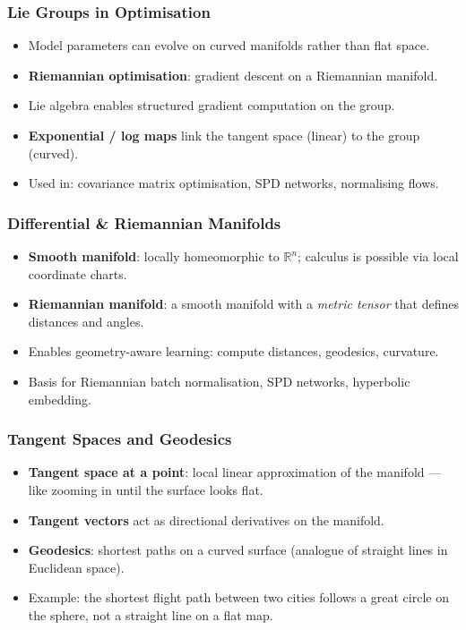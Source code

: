 \begin{frame}[fragile]\frametitle{Lie Groups in Optimisation}
  \begin{itemize}
    \item Model parameters can evolve on curved manifolds rather than flat space.
    \item \textbf{Riemannian optimisation}: gradient descent on a Riemannian manifold.
    \item Lie algebra enables structured gradient computation on the group.
    \item \textbf{Exponential / log maps} link the tangent space (linear) to the group (curved).
    \item Used in: covariance matrix optimisation, SPD networks, normalising flows.
  \end{itemize}
\end{frame}

\begin{frame}[fragile]\frametitle{Differential \& Riemannian Manifolds}
  \begin{itemize}
    \item \textbf{Smooth manifold}: locally homeomorphic to $\mathbb{R}^n$; calculus is possible via local coordinate charts.
    \item \textbf{Riemannian manifold}: a smooth manifold with a \emph{metric tensor} that defines distances and angles.
    \item Enables geometry-aware learning: compute distances, geodesics, curvature.
    \item Basis for Riemannian batch normalisation, SPD networks, hyperbolic embedding.
  \end{itemize}
\end{frame}

\begin{frame}[fragile]\frametitle{Tangent Spaces and Geodesics}
  \begin{itemize}
    \item \textbf{Tangent space at a point}: local linear approximation of the manifold --- like zooming in until the surface looks flat.
    \item \textbf{Tangent vectors} act as directional derivatives on the manifold.
    \item \textbf{Geodesics}: shortest paths on a curved surface (analogue of straight lines in Euclidean space).
    \item Example: the shortest flight path between two cities follows a great circle on the sphere, not a straight line on a flat map.
  \end{itemize}
\end{frame}

